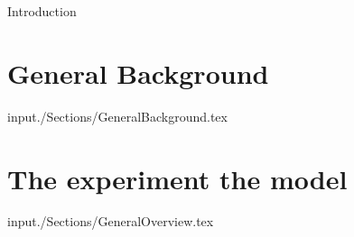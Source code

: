 

Introduction   

\section{General Background}
input{./Sections/GeneralBackground.tex}

\section{The experiment  the model}
\label{sec:general_overview}
input{./Sections/GeneralOverview.tex}
